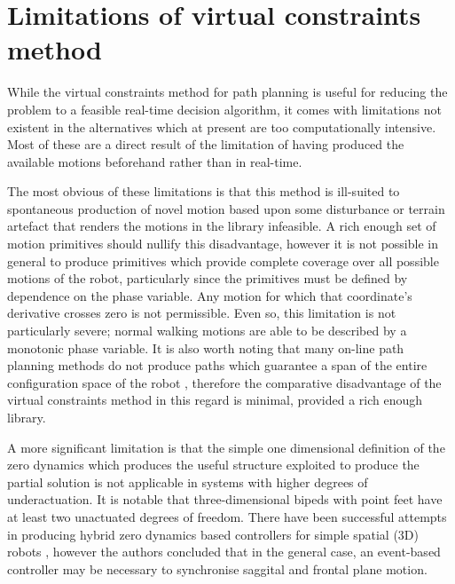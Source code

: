 \section{Limitations of virtual constraints method}
While the virtual constraints method for path planning is useful for reducing the problem to a feasible real-time decision algorithm, it comes with limitations not existent in the alternatives which at present are too computationally intensive. Most of these are a direct result of the limitation of having produced the available motions beforehand rather than in real-time.

The most obvious of these limitations is that this method is ill-suited to spontaneous production of novel motion based upon some disturbance or terrain artefact that renders the motions in the library infeasible. A rich enough set of motion primitives should nullify this disadvantage, however it is not possible in general to produce primitives which provide complete coverage over all possible motions of the robot, particularly since the primitives must be defined by dependence on the phase variable. Any motion for which that coordinate's derivative crosses zero is not permissible. Even so, this limitation is not particularly severe; normal walking motions are able to be described by a monotonic phase variable. It is also worth noting that many on-line path planning methods do not produce paths which guarantee a span of the entire configuration space of the robot \cite{boor1999gaussian, lavalle2001randomized, frazzoli2002real}, therefore the comparative disadvantage of the virtual constraints method in this regard is minimal, provided a rich enough library. 


A more significant limitation is that the simple one dimensional definition of the zero dynamics which produces the useful structure exploited to produce the partial solution is not applicable in systems with higher degrees of underactuation. It is notable that three-dimensional bipeds with point feet have at least two unactuated degrees of freedom. There have been successful attempts in producing hybrid zero dynamics based controllers for simple spatial (3D) robots \cite{shih2007asymptotically}, however the authors concluded that in the general case, an event-based controller may be necessary to synchronise saggital and frontal plane motion.

